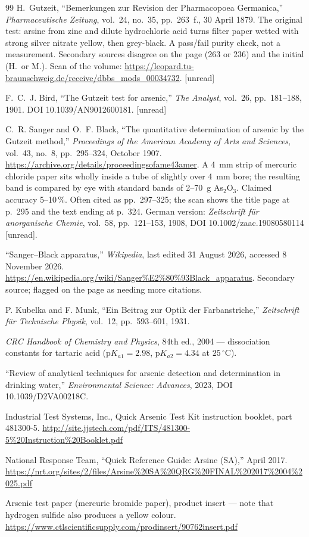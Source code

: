 \documentclass[11pt,a4paper]{article}
\begin{document}
\begin{thebibliography}{99}
H.~Gutzeit,
``Bemerkungen zur Revision der Pharmacopoea Germanica,''
\emph{Pharmaceutische Zeitung}, vol.~24, no.~35, pp.~263~f., 30 April 1879.
The original test: arsine from zinc and dilute hydrochloric acid turns
filter paper wetted with strong silver nitrate yellow, then grey-black.
A pass/fail purity check, not a measurement.
Secondary sources disagree on the page (263 or 236) and the initial (H.\ or M.).
Scan of the volume:
\url{https://leopard.tu-braunschweig.de/receive/dbbs_mods_00034732}.
[unread]

F.~C.~J. Bird, ``The Gutzeit test for arsenic,''
\emph{The Analyst}, vol.~26, pp.~181--188, 1901.
DOI 10.1039/AN9012600181.
[unread]

C.~R. Sanger and O.~F. Black,
``The quantitative determination of arsenic by the Gutzeit method,''
\emph{Proceedings of the American Academy of Arts and Sciences},
vol.~43, no.~8, pp.~295--324, October 1907.
\url{https://archive.org/details/proceedingsofame43amer}.
A 4~mm strip of mercuric chloride paper sits wholly inside a tube of
slightly over 4~mm bore; the resulting band is compared by eye with
standard bands of 2--70~\textmu g As$_2$O$_3$. Claimed accuracy
5--10\,\%. Often cited as pp.~297--325; the scan shows the title page
at p.~295 and the text ending at p.~324.
German version: \emph{Zeitschrift f\"ur anorganische Chemie}, vol.~58,
pp.~121--153, 1908, DOI 10.1002/zaac.19080580114 [unread].

``Sanger--Black apparatus,'' \emph{Wikipedia}, last edited 31 August 2026,
accessed 8 November 2026.
\url{https://en.wikipedia.org/wiki/Sanger\%E2\%80\%93Black_apparatus}.
Secondary source; flagged on the page as needing more citations.

P. Kubelka and F. Munk,
``Ein Beitrag zur Optik der Farbanstriche,''
\emph{Zeitschrift f\"ur Technische Physik}, vol.~12, pp.~593--601, 1931.

\emph{CRC Handbook of Chemistry and Physics}, 84th ed., 2004 ---
dissociation constants for tartaric acid
($\mathrm{p}K_{a1} = 2.98$, $\mathrm{p}K_{a2} = 4.34$ at $25\,^\circ$C).

``Review of analytical techniques for arsenic detection and determination in
drinking water,''
\emph{Environmental Science: Advances}, 2023, DOI 10.1039/D2VA00218C.

Industrial Test Systems, Inc.,
Quick\texttrademark{} Arsenic Test Kit instruction booklet, part 481300-5.
\url{http://site.jjstech.com/pdf/ITS/481300-5\%20Instruction\%20Booklet.pdf}

National Response Team,
``Quick Reference Guide: Arsine (SA),'' April 2017.
\url{https://nrt.org/sites/2/files/Arsine\%20SA\%20QRG\%20FINAL\%202017\%2004\%2025.pdf}

Arsenic test paper (mercuric bromide paper), product insert ---
note that hydrogen sulfide also produces a yellow colour.
\url{https://www.ctlscientificsupply.com/prodinsert/90762insert.pdf}

\end{thebibliography}
\end{document}
